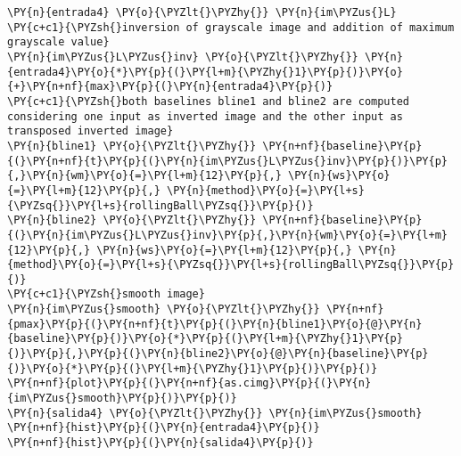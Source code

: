     \begin{tcolorbox}[breakable, size=fbox, boxrule=1pt, pad at break*=1mm,colback=cellbackground, colframe=cellborder]
\begin{Verbatim}[commandchars=\\\{\}]
\PY{n}{entrada4} \PY{o}{\PYZlt{}\PYZhy{}} \PY{n}{im\PYZus{}L}
\PY{c+c1}{\PYZsh{}inversion of grayscale image and addition of maximum grayscale value}
\PY{n}{im\PYZus{}L\PYZus{}inv} \PY{o}{\PYZlt{}\PYZhy{}} \PY{n}{entrada4}\PY{o}{*}\PY{p}{(}\PY{l+m}{\PYZhy{}1}\PY{p}{)}\PY{o}{+}\PY{n+nf}{max}\PY{p}{(}\PY{n}{entrada4}\PY{p}{)}
\PY{c+c1}{\PYZsh{}both baselines bline1 and bline2 are computed considering one input as inverted image and the other input as transposed inverted image}
\PY{n}{bline1} \PY{o}{\PYZlt{}\PYZhy{}} \PY{n+nf}{baseline}\PY{p}{(}\PY{n+nf}{t}\PY{p}{(}\PY{n}{im\PYZus{}L\PYZus{}inv}\PY{p}{)}\PY{p}{,}\PY{n}{wm}\PY{o}{=}\PY{l+m}{12}\PY{p}{,} \PY{n}{ws}\PY{o}{=}\PY{l+m}{12}\PY{p}{,} \PY{n}{method}\PY{o}{=}\PY{l+s}{\PYZsq{}}\PY{l+s}{rollingBall\PYZsq{}}\PY{p}{)}
\PY{n}{bline2} \PY{o}{\PYZlt{}\PYZhy{}} \PY{n+nf}{baseline}\PY{p}{(}\PY{n}{im\PYZus{}L\PYZus{}inv}\PY{p}{,}\PY{n}{wm}\PY{o}{=}\PY{l+m}{12}\PY{p}{,} \PY{n}{ws}\PY{o}{=}\PY{l+m}{12}\PY{p}{,} \PY{n}{method}\PY{o}{=}\PY{l+s}{\PYZsq{}}\PY{l+s}{rollingBall\PYZsq{}}\PY{p}{)}
\PY{c+c1}{\PYZsh{}smooth image}
\PY{n}{im\PYZus{}smooth} \PY{o}{\PYZlt{}\PYZhy{}} \PY{n+nf}{pmax}\PY{p}{(}\PY{n+nf}{t}\PY{p}{(}\PY{n}{bline1}\PY{o}{@}\PY{n}{baseline}\PY{p}{)}\PY{o}{*}\PY{p}{(}\PY{l+m}{\PYZhy{}1}\PY{p}{)}\PY{p}{,}\PY{p}{(}\PY{n}{bline2}\PY{o}{@}\PY{n}{baseline}\PY{p}{)}\PY{o}{*}\PY{p}{(}\PY{l+m}{\PYZhy{}1}\PY{p}{)}\PY{p}{)}
\PY{n+nf}{plot}\PY{p}{(}\PY{n+nf}{as.cimg}\PY{p}{(}\PY{n}{im\PYZus{}smooth}\PY{p}{)}\PY{p}{)}
\PY{n}{salida4} \PY{o}{\PYZlt{}\PYZhy{}} \PY{n}{im\PYZus{}smooth}
\PY{n+nf}{hist}\PY{p}{(}\PY{n}{entrada4}\PY{p}{)}
\PY{n+nf}{hist}\PY{p}{(}\PY{n}{salida4}\PY{p}{)}
\end{Verbatim}
\end{tcolorbox}

    \begin{center}
    \end{center}
    { \hspace*{\fill} \\}
    
    \begin{center}
    \end{center}
    { \hspace*{\fill} \\}
    
    \begin{center}
    \end{center}
    { \hspace*{\fill} \\}
 